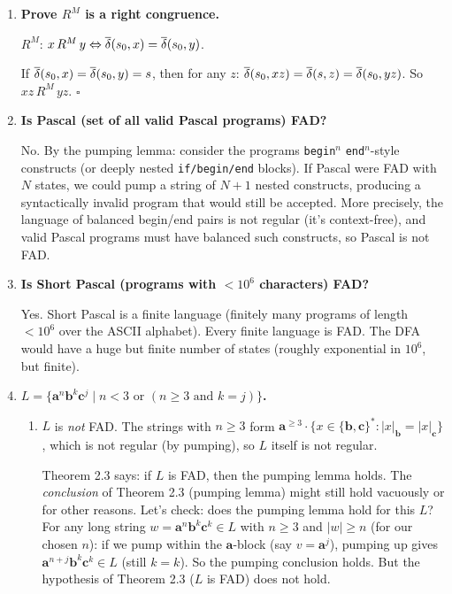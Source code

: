 \begin{enumerate}[{2.}1.]
\item \textbf{Prove $R^M$ is a right congruence.}

$R^M$: $x\,R^M\,y\Leftrightarrow\overline{\delta}(s_0,x)=\overline{\delta}(s_0,y)$.

If $\overline{\delta}(s_0,x)=\overline{\delta}(s_0,y)=s$, then for any $z$: $\overline{\delta}(s_0,xz)=\overline{\delta}(s,z)=\overline{\delta}(s_0,yz)$. So $xz\,R^M\,yz$. $\square$

\item \textbf{Is Pascal (set of all valid Pascal programs) FAD?}

No. By the pumping lemma: consider the programs \texttt{begin}$^n$ \texttt{end}$^n$-style constructs (or deeply nested \texttt{if/begin/end} blocks). If Pascal were FAD with $N$ states, we could pump a string of $N+1$ nested constructs, producing a syntactically invalid program that would still be accepted. More precisely, the language of balanced begin/end pairs is not regular (it's context-free), and valid Pascal programs must have balanced such constructs, so Pascal is not FAD.

\item \textbf{Is Short Pascal (programs with $<10^6$ characters) FAD?}

Yes. Short Pascal is a finite language (finitely many programs of length $<10^6$ over the ASCII alphabet). Every finite language is FAD. The DFA would have a huge but finite number of states (roughly exponential in $10^6$, but finite).

\item \textbf{$L=\{\mathbf{a}^n\mathbf{b}^k\mathbf{c}^j\mid n<3\text{ or }(n\geq 3\text{ and }k=j)\}$.}

\begin{enumerate}
\item $L$ is \emph{not} FAD. The strings with $n\geq 3$ form $\mathbf{a}^{\geq 3}\cdot\{x\in\{\mathbf{b},\mathbf{c}\}^*:|x|_\mathbf{b}=|x|_\mathbf{c}\}$, which is not regular (by pumping), so $L$ itself is not regular.

Theorem 2.3 says: if $L$ is FAD, then the pumping lemma holds. The \emph{conclusion} of Theorem 2.3 (pumping lemma) might still hold vacuously or for other reasons. Let's check: does the pumping lemma hold for this $L$? For any long string $w=\mathbf{a}^n\mathbf{b}^k\mathbf{c}^k\in L$ with $n\geq 3$ and $|w|\geq n$ (for our chosen $n$): if we pump within the $\mathbf{a}$-block (say $v=\mathbf{a}^j$), pumping up gives $\mathbf{a}^{n+j}\mathbf{b}^k\mathbf{c}^k\in L$ (still $k=k$). So the pumping conclusion holds. But the hypothesis of Theorem 2.3 ($L$ is FAD) does not hold.


\end{enumerate}
\end{enumerate}
